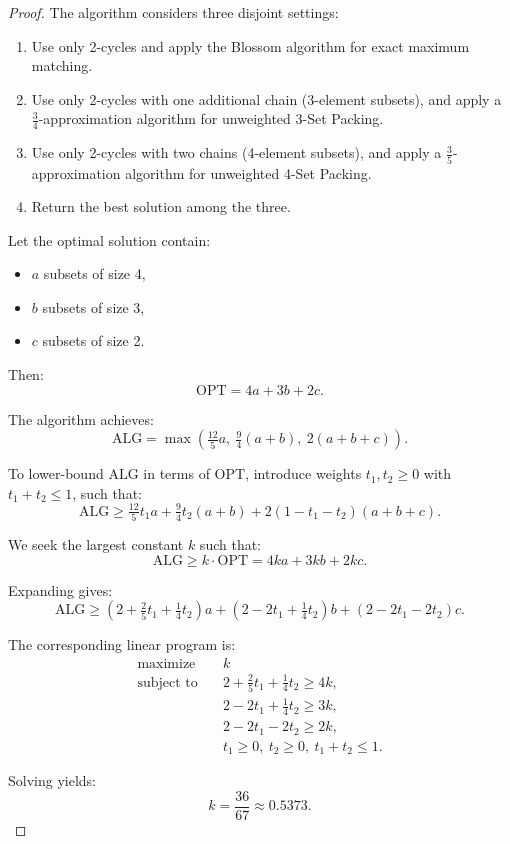 \begin{proof}
The algorithm considers three disjoint settings:
\begin{enumerate}
    \item Use only 2-cycles and apply the Blossom algorithm for exact maximum matching.
    \item Use only 2-cycles with one additional chain (3-element subsets), and apply a $\frac{3}{4}$-approximation algorithm for unweighted 3-Set Packing.
    \item Use only 2-cycles with two chains (4-element subsets), and apply a $\frac{3}{5}$-approximation algorithm for unweighted 4-Set Packing.
    \item Return the best solution among the three.
\end{enumerate}

Let the optimal solution contain:
\begin{itemize}
    \item $a$ subsets of size 4,
    \item $b$ subsets of size 3,
    \item $c$ subsets of size 2.
\end{itemize}
Then:
\[
\mathrm{OPT} = 4a + 3b + 2c.
\]

The algorithm achieves:
\[
\mathrm{ALG} = \max\left(\tfrac{12}{5} a,\ \tfrac{9}{4}(a + b),\ 2(a + b + c)\right).
\]

To lower-bound $\mathrm{ALG}$ in terms of $\mathrm{OPT}$, introduce weights $t_1, t_2 \ge 0$ with $t_1 + t_2 \le 1$, such that:
\[
\mathrm{ALG} \ge \tfrac{12}{5} t_1 a + \tfrac{9}{4} t_2 (a + b) + 2(1 - t_1 - t_2)(a + b + c).
\]

We seek the largest constant $k$ such that:
\[
\mathrm{ALG} \ge k \cdot \mathrm{OPT} = 4ka + 3kb + 2kc.
\]

Expanding gives:
\[
\mathrm{ALG} \ge \left(2 + \tfrac{2}{5} t_1 + \tfrac{1}{4} t_2\right) a
+ \left(2 - 2t_1 + \tfrac{1}{4} t_2\right) b
+ \left(2 - 2t_1 - 2t_2\right) c.
\]

The corresponding linear program is:
\[
\begin{aligned}
\text{maximize} \quad & k \\
\text{subject to} \quad
& 2 + \tfrac{2}{5} t_1 + \tfrac{1}{4} t_2 \ge 4k, \\
& 2 - 2t_1 + \tfrac{1}{4} t_2 \ge 3k, \\
& 2 - 2t_1 - 2t_2 \ge 2k, \\
& t_1 \ge 0,\ t_2 \ge 0,\ t_1 + t_2 \le 1.
\end{aligned}
\]

Solving yields:
\[
\boxed{k = \frac{36}{67} \approx 0.5373.}
\]
\end{proof}


